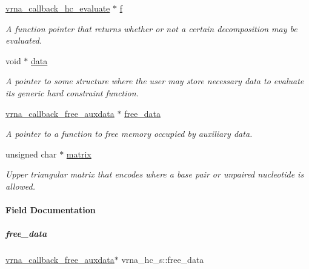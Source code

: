 \begin{DoxyCompactItemize}
\hyperlink{group__hard__constraints_gae465f1d4a3d8b6592b38ecbb0d9f613d}{vrna\+\_\+callback\+\_\+hc\+\_\+evaluate} $\ast$ \hyperlink{group__hard__constraints_a85714afbf27012165ec80c564bd62931}{f}
\begin{DoxyCompactList}\small\item\em A function pointer that returns whether or not a certain decomposition may be evaluated. \end{DoxyCompactList}\item 
\mbox{\label{group__hard__constraints_acef3d722142cb5f4a8e114e5fbce3b1a}} 
void $\ast$ \hyperlink{group__hard__constraints_acef3d722142cb5f4a8e114e5fbce3b1a}{data}
\begin{DoxyCompactList}\small\item\em A pointer to some structure where the user may store necessary data to evaluate its generic hard constraint function. \end{DoxyCompactList}\item 
\hyperlink{group__fold__compound_ga7806651f51b195013839a218b3bbd5a3}{vrna\+\_\+callback\+\_\+free\+\_\+auxdata} $\ast$ \hyperlink{group__hard__constraints_a970e0e202c9e46ebc7640ddc43357ba6}{free\+\_\+data}
\begin{DoxyCompactList}\small\item\em A pointer to a function to free memory occupied by auxiliary data. \end{DoxyCompactList}\item 
\mbox{\label{group__hard__constraints_a6ff99f530ca7ca9719e164321d051bde}} 
unsigned char $\ast$ \hyperlink{group__hard__constraints_a6ff99f530ca7ca9719e164321d051bde}{matrix}
\begin{DoxyCompactList}\small\item\em Upper triangular matrix that encodes where a base pair or unpaired nucleotide is allowed. \end{DoxyCompactList}\end{DoxyCompactItemize}


\paragraph{Field Documentation}
\mbox{\label{group__hard__constraints_a970e0e202c9e46ebc7640ddc43357ba6}} 
\subparagraph{\texorpdfstring{free\+\_\+data}{free\_data}}
{\footnotesize\ttfamily \hyperlink{group__fold__compound_ga7806651f51b195013839a218b3bbd5a3}{vrna\+\_\+callback\+\_\+free\+\_\+auxdata}$\ast$ vrna\+\_\+hc\+\_\+s\+::free\+\_\+data}




